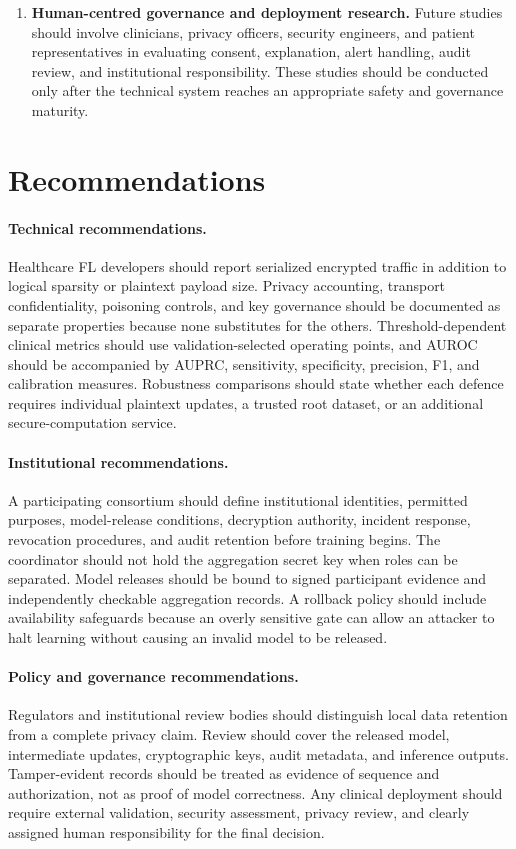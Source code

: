 \begin{enumerate}
    \item \textbf{Human-centred governance and deployment research.} Future studies should involve clinicians, privacy officers, security engineers, and patient representatives in evaluating consent, explanation, alert handling, audit review, and institutional responsibility. These studies should be conducted only after the technical system reaches an appropriate safety and governance maturity.
\end{enumerate}

\section{Recommendations}
\label{sec:conclusion-recommendations}

\paragraph{Technical recommendations.}
Healthcare FL developers should report serialized encrypted traffic in addition to logical sparsity or plaintext payload size. Privacy accounting, transport confidentiality, poisoning controls, and key governance should be documented as separate properties because none substitutes for the others. Threshold-dependent clinical metrics should use validation-selected operating points, and AUROC should be accompanied by AUPRC, sensitivity, specificity, precision, F1, and calibration measures. Robustness comparisons should state whether each defence requires individual plaintext updates, a trusted root dataset, or an additional secure-computation service.

\paragraph{Institutional recommendations.}
A participating consortium should define institutional identities, permitted purposes, model-release conditions, decryption authority, incident response, revocation procedures, and audit retention before training begins. The coordinator should not hold the aggregation secret key when roles can be separated. Model releases should be bound to signed participant evidence and independently checkable aggregation records. A rollback policy should include availability safeguards because an overly sensitive gate can allow an attacker to halt learning without causing an invalid model to be released.

\paragraph{Policy and governance recommendations.}
Regulators and institutional review bodies should distinguish local data retention from a complete privacy claim. Review should cover the released model, intermediate updates, cryptographic keys, audit metadata, and inference outputs. Tamper-evident records should be treated as evidence of sequence and authorization, not as proof of model correctness. Any clinical deployment should require external validation, security assessment, privacy review, and clearly assigned human responsibility for the final decision.

